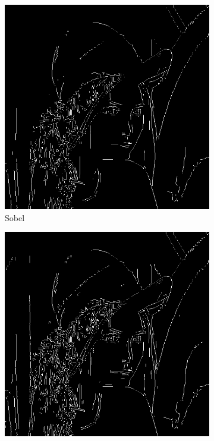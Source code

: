 \documentclass[a4paper]{article}
\begin{document}
\begin{figure}[H]
\centering
	\begin{subfigure}[t]{0.3\textwidth}
	\centering
	\includegraphics[width=\textwidth]{imagenesInforme/lenaHysteresisSobel}
	\caption{Sobel}
	\end{subfigure}
	\begin{subfigure}[t]{0.3\textwidth}
	\centering
	\includegraphics[width=\textwidth]{imagenesInforme/lenaHysteresisPrewitt}

\end{subfigure}
\end{figure}
\end{document}
